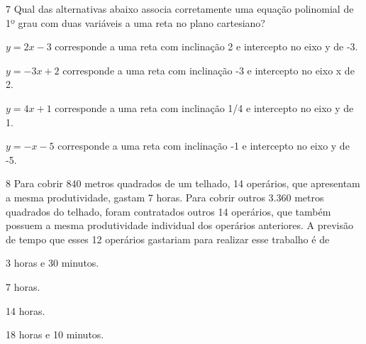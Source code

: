 \num{7} Qual das alternativas abaixo associa corretamente uma equação
polinomial de 1º grau com duas variáveis a uma reta no plano cartesiano?

\begin{escolha}
\item $y = 2x - 3$ corresponde a uma reta com inclinação 2 e intercepto no
eixo y de -3.
\item $y = -3x + 2$ corresponde a uma reta com inclinação -3 e intercepto no
eixo x de 2.
\item $y = 4x + 1$ corresponde a uma reta com inclinação 1/4 e intercepto no
eixo y de 1.
\item $y = -x - 5$ corresponde a uma reta com inclinação -1 e intercepto no
eixo y de -5.
\end{escolha}







\pagebreak

\num{8} Para cobrir 840 metros quadrados de um telhado, 14 operários, que apresentam a
mesma produtividade, gastam 7 horas. Para cobrir outros 3.360 metros quadrados do
telhado, foram contratados outros 14 operários, que também possuem a
mesma produtividade individual dos operários anteriores. A previsão de
tempo que esses 12 operários gastariam para realizar esse trabalho é de

\begin{escolha}
\item 3 horas e 30 minutos.
\item 7 horas.
\item 14 horas.
\item 18 horas e 10 minutos.
\end{escolha}

